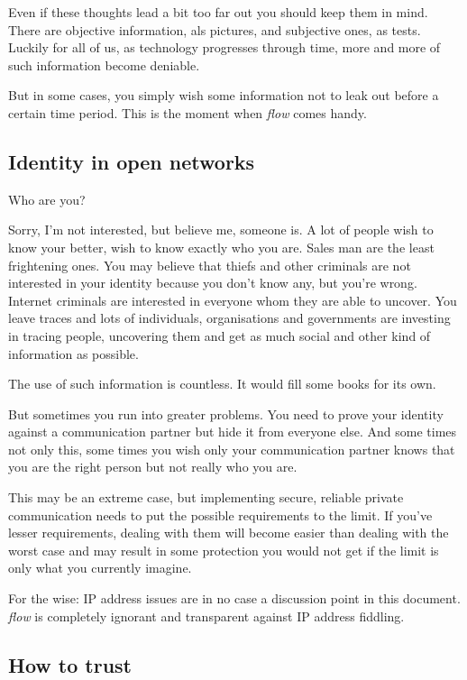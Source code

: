 \documentclass[twoside,a4paper,english,12pt,authoryear,openright]{book}
\newcommand{\flow}{\textit{flow} }
\begin{document}
Even if these thoughts lead a bit too far out you should keep them in mind. There are objective information, als pictures, and subjective ones, as tests. Luckily for all of us, as technology progresses through time, more and more of such information become deniable.

But in some cases, you simply wish some information not to leak out before a certain time period. This is the moment when \flow comes handy.


\subsection{Identity in open networks}

Who are you?

Sorry, I'm not interested, but believe me, someone is. A lot of people wish to know your better, wish to know exactly who you are. Sales man are the least frightening ones. You may believe that thiefs and other criminals are not interested in your identity because you don't know any, but you're wrong. Internet criminals are interested in everyone whom they are able to uncover. You leave traces and lots of individuals, organisations and governments are investing in tracing people, uncovering them and get as much social and other kind of information as possible.

The use of such information is countless. It would fill some books for its own.

But sometimes you run into greater problems. You need to prove your identity against a communication partner but hide it from everyone else. And some times not only this, some times you wish only your communication partner knows that you are the right person but not really who you are.

This may be an extreme case, but implementing secure, reliable private communication needs to put the possible requirements to the limit. If you've lesser requirements, dealing with them will become easier than dealing with the worst case and may result in some protection you would not get if the limit is only what you currently imagine.

For the wise: IP address issues are in no case a discussion point in this document. \flow is completely ignorant and transparent against IP address fiddling.


\subsection{How to trust}
\end{document}
